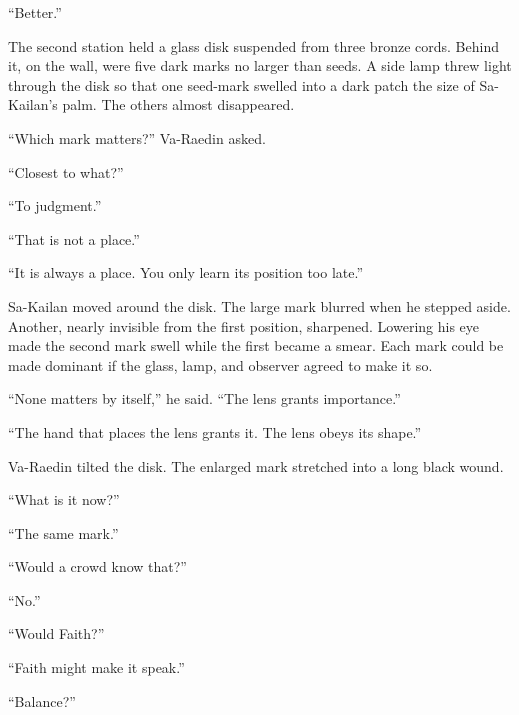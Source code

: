 “Better.”\par

The second station held a glass disk suspended from three bronze cords.
Behind it, on the wall, were five dark marks no larger than seeds.
A side lamp threw light through the disk so that one seed-mark swelled into a dark patch the size of Sa-Kailan’s palm.
The others almost disappeared.\par

“Which mark matters?” Va-Raedin asked.\par

“Closest to what?”\par

“To judgment.”\par

“That is not a place.”\par

“It is always a place.
You only learn its position too late.”\par

Sa-Kailan moved around the disk.
The large mark blurred when he stepped aside.
Another, nearly invisible from the first position, sharpened.
Lowering his eye made the second mark swell while the first became a smear.
Each mark could be made dominant if the glass, lamp, and observer agreed to make it so.\par

“None matters by itself,” he said.
“The lens grants importance.”\par

“The hand that places the lens grants it.
The lens obeys its shape.”\par

Va-Raedin tilted the disk.
The enlarged mark stretched into a long black wound.\par

“What is it now?”\par

“The same mark.”\par

“Would a crowd know that?”\par

“No.”\par

“Would Faith?”\par

“Faith might make it speak.”\par

“Balance?”\par

